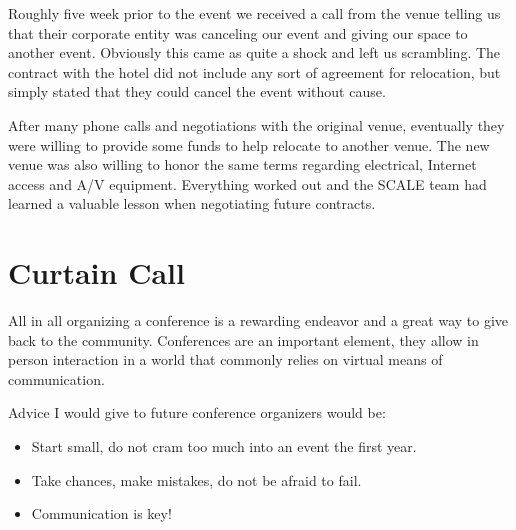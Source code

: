 Roughly five week prior to the event we received a call from the venue telling
us that their corporate entity was canceling our event and giving our space to
another event. Obviously this came as quite a shock and left us scrambling. 
The contract with the hotel did not include any sort of agreement for
relocation, but simply stated that they could cancel the event without cause.

After many phone calls and negotiations with the original venue, eventually they
were willing to provide some funds to help relocate to another venue. The new
venue was also willing to honor the same terms regarding electrical, Internet
access and A/V equipment. Everything worked out and the SCALE team had learned
a valuable lesson when negotiating future contracts.

\section*{Curtain Call}

All in all organizing a conference is a rewarding endeavor and a great way to
give back to the community. Conferences are an important element, they allow in
person interaction in a world that commonly relies on virtual means of
communication.

Advice I would give to future conference organizers would be:
\begin{itemize}
 \item Start small, do not cram too much into an event the first year.
 \item Take chances, make mistakes, do not be afraid to fail.
 \item Communication is key!
\end{itemize}

